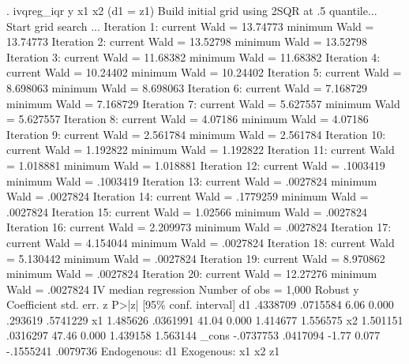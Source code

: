 . ivqreg_iqr y x1 x2 (d1 = z1)
{\smallskip}
Build initial grid using 2SQR at .5 quantile...
{\smallskip}
Start grid search ...
Iteration     1:  current Wald =  13.74773         minimum Wald =  13.74773
Iteration     2:  current Wald =  13.52798         minimum Wald =  13.52798
Iteration     3:  current Wald =  11.68382         minimum Wald =  11.68382
Iteration     4:  current Wald =  10.24402         minimum Wald =  10.24402
Iteration     5:  current Wald =  8.698063         minimum Wald =  8.698063
Iteration     6:  current Wald =  7.168729         minimum Wald =  7.168729
Iteration     7:  current Wald =  5.627557         minimum Wald =  5.627557
Iteration     8:  current Wald =   4.07186         minimum Wald =   4.07186
Iteration     9:  current Wald =  2.561784         minimum Wald =  2.561784
Iteration    10:  current Wald =  1.192822         minimum Wald =  1.192822
Iteration    11:  current Wald =  1.018881         minimum Wald =  1.018881
Iteration    12:  current Wald =  .1003419         minimum Wald =  .1003419
Iteration    13:  current Wald =  .0027824         minimum Wald =  .0027824
Iteration    14:  current Wald =  .1779259         minimum Wald =  .0027824
Iteration    15:  current Wald =   1.02566         minimum Wald =  .0027824
Iteration    16:  current Wald =  2.209973         minimum Wald =  .0027824
Iteration    17:  current Wald =  4.154044         minimum Wald =  .0027824
Iteration    18:  current Wald =  5.130442         minimum Wald =  .0027824
Iteration    19:  current Wald =  8.970862         minimum Wald =  .0027824
Iteration    20:  current Wald =  12.27276         minimum Wald =  .0027824
{\smallskip}
IV median regression                  Number of obs               =      1,000
             {\VBAR}               Robust
           y {\VBAR} Coefficient  std. err.      z    P>|z|     [95\% conf. interval]
          d1 {\VBAR}   .4338709   .0715584     6.06   0.000      .293619    .5741229
          x1 {\VBAR}   1.485626   .0361991    41.04   0.000     1.414677    1.556575
          x2 {\VBAR}   1.501151   .0316297    47.46   0.000     1.439158    1.563144
       _cons {\VBAR}  -.0737753   .0417094    -1.77   0.077    -.1555241    .0079736
Endogenous: d1
 Exogenous: x1 x2 z1
{\smallskip}
